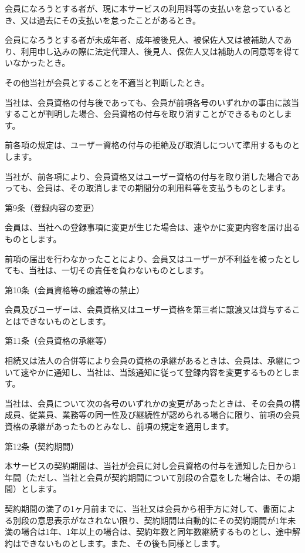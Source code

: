         会員になろうとする者が、現に本サービスの利用料等の支払いを怠っているとき、又は過去にその支払いを怠ったことがあるとき。

        会員になろうとする者が未成年者、成年被後見人、被保佐人又は被補助人であり、利用申し込みの際に法定代理人、後見人、保佐人又は補助人の同意等を得ていなかったとき。

        その他当社が会員とすることを不適当と判断したとき。

    当社は、会員資格の付与後であっても、会員が前項各号のいずれかの事由に該当することが判明した場合、会員資格の付与を取り消すことができるものとします。

    前各項の規定は、ユーザー資格の付与の拒絶及び取消しについて準用するものとします。

    当社が、前各項により、会員資格又はユーザー資格の付与を取り消した場合であっても、会員は、その取消しまでの期間分の利用料等を支払うものとします。

第9条（登録内容の変更）

    会員は、当社への登録事項に変更が生じた場合は、速やかに変更内容を届け出るものとします。

    前項の届出を行わなかったことにより、会員又はユーザーが不利益を被ったとしても、当社は、一切その責任を負わないものとします。

第10条（会員資格等の譲渡等の禁止）

    会員及びユーザーは、会員資格又はユーザー資格を第三者に譲渡又は貸与することはできないものとします。

第11条（会員資格の承継等）

    相続又は法人の合併等により会員の資格の承継があるときは、会員は、承継について速やかに通知し、当社は、当該通知に従って登録内容を変更するものとします。

    当社は、会員について次の各号のいずれかの変更があったときは、その会員の構成員、従業員、業務等の同一性及び継続性が認められる場合に限り、前項の会員資格の承継があったものとみなし、前項の規定を適用します。

第12条（契約期間）

    本サービスの契約期間は、当社が会員に対し会員資格の付与を通知した日から1年間（ただし、当社と会員が契約期間について別段の合意をした場合は、その期間）とします。

    契約期間の満了の1ヶ月前までに、当社又は会員から相手方に対して、書面による別段の意思表示がなされない限り、契約期間は自動的にその契約期間が1年未満の場合は1年、1年以上の場合は、契約年数と同年数継続するものとし、途中解約はできないものとします。また、その後も同様とします。

